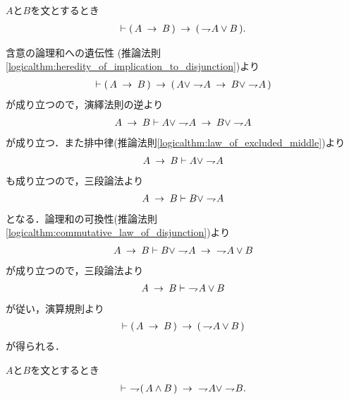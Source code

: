 	\begin{screen}
		\begin{logicalthm}[含意は否定と論理和で表せる]
		\label{logicalthm:implication_rewritable_by_disjunction_of_negation}
			$A$と$B$を文とするとき
			\begin{align}
				\vdash (\, A \rarrow B\, ) \rarrow (\, \negation A \vee B\, ).
			\end{align}
		\end{logicalthm}
	\end{screen}
	
	\begin{prf}
		含意の論理和への遺伝性
		(推論法則\ref{logicalthm:heredity_of_implication_to_disjunction})より
		\begin{align}
			\vdash (\, A \rarrow B\, ) 
			\rarrow (\, A \vee \negation A \rarrow B \vee \negation A\, )
		\end{align}
		が成り立つので，演繹法則の逆より
		\begin{align}
			A \rarrow B \vdash A \vee \negation A \rarrow B \vee \negation A
		\end{align}
		が成り立つ．また排中律(推論法則\ref{logicalthm:law_of_excluded_middle})より
		\begin{align}
			A \rarrow B \vdash A \vee \negation A
		\end{align}
		も成り立つので，三段論法より
		\begin{align}
			A \rarrow B \vdash B \vee \negation A
		\end{align}
		となる．論理和の可換性(推論法則\ref{logicalthm:commutative_law_of_disjunction})より
		\begin{align}
			A \rarrow B \vdash B \vee \negation A \rarrow\ \negation A \vee B
		\end{align}
		が成り立つので，三段論法より
		\begin{align}
			A \rarrow B \vdash\ \negation A \vee B
		\end{align}
		が従い，演算規則より
		\begin{align}
			\vdash (\, A \rarrow B\, ) \rarrow (\, \negation A \vee B\, )
		\end{align}
		が得られる．
		\QED
	\end{prf}
	
	\begin{screen}
		\begin{logicalthm}
		\label{logicalthm:strong_De_Morgan_law_2}
			$A$と$B$を文とするとき
			\begin{align}
				\vdash\ \negation (\, A \wedge B\, )
				\rarrow\ \negation A \vee \negation B.
			\end{align}
		\end{logicalthm}
	\end{screen}
	
